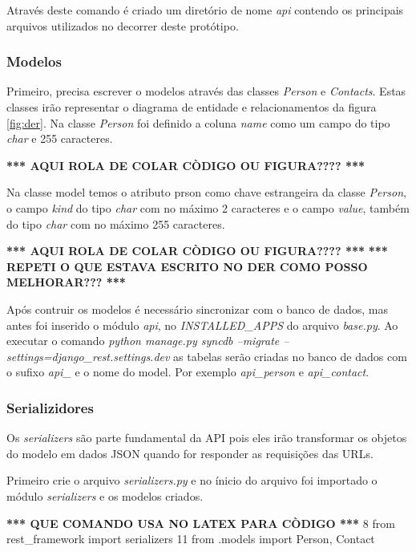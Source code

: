   Através deste comando é criado um diretório de nome \textit{api} contendo os principais arquivos utilizados no decorrer deste protótipo.

\subsubsection{Modelos}

  Primeiro, precisa escrever o modelos através das classes \textit{Person} e \textit{Contacts}. Estas classes irão representar o diagrama
  de entidade e relacionamentos da figura \ref{fig:der}. Na classe \textit{Person} foi definido a coluna \textit{name} como um campo 
  do tipo \textit{char} e 255 caracteres.
  
  \textbf{*** AQUI ROLA DE COLAR CÒDIGO OU FIGURA???? *** }
  
  Na classe model  temos o atributo prson como chave estrangeira da classe \textit{Person}, o campo \textit{kind} do
  tipo \textit{char} com no máximo 2 caracteres e o campo \textit{value}, também do tipo \textit{char} com no máximo 255 caracteres.
  
  \textbf{*** AQUI ROLA DE COLAR CÒDIGO OU FIGURA???? *** }
  \textbf{*** REPETI O QUE ESTAVA ESCRITO NO DER COMO POSSO MELHORAR??? *** }
  
  Após contruir os modelos é necessário sincronizar com o banco de dados, mas antes foi inserido o módulo \textit{api}, no 
  \textit{INSTALLED_APPS} do arquivo \textit{base.py}. Ao executar o comando \textit{python manage.py syncdb --migrate --settings=django_rest.settings.dev}
  as tabelas serão criadas no banco de dados com o sufixo \textit{api_} e o nome do model. Por exemplo \textit{api_person} e \textit{api_contact}.
  
\subsubsection{Serializidores}

  Os \textit{serializers} são parte fundamental da API pois eles irão transformar os objetos do modelo em dados JSON quando for 
  responder as requisições das URLs.
  
  Primeiro crie o arquivo \textit{serializers.py} e no ínicio do arquivo foi importado o módulo \textit{serializers} e os modelos
  criados.
  
  \textbf{*** QUE COMANDO USA NO LATEX PARA CÒDIGO *** }
  8 from rest_framework import serializers 
  11 from .models import Person, Contact
  
